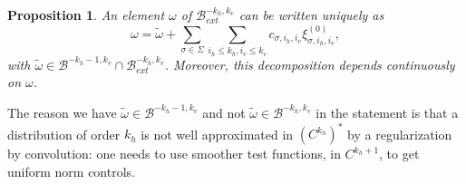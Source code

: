 \documentclass[11pt, a4paper, oneside, final, pagebackref]{amsart}
\newcommand{\boB}{\mathcal{B}}
\renewcommand{\leq}{\leqslant}
\newtheorem{prop}[thm]{Proposition}
\theoremstyle{definition}
\numberwithin{equation}{section}
\begin{document}
\begin{prop}
\label{prop:finite_codim} An element $\omega$ of $\boB_{ext}^{-k_h, k_v}$ can
be written uniquely as
\begin{equation}
\label{eq:dec_omega}
\omega = \tilde \omega + \sum_{\sigma \in \Sigma} \sum_{i_h \leq k_h, i_v\leq
k_v} c_{\sigma, i_h, i_v} \xi^{(0)}_{\sigma, i_h, i_v},
\end{equation}
with $\tilde\omega \in\boB^{-k_h-1, k_v} \cap \boB_{ext}^{-k_h, k_v}$.
Moreover, this decomposition depends continuously on $\omega$.
\end{prop}
The reason we have $\tilde\omega \in\boB^{-k_h-1, k_v}$ and not $\tilde\omega
\in\boB^{-k_h, k_v}$ in the statement is that a distribution of order $k_h$
is not well approximated in $(C^{k_h})^*$ by a regularization by convolution:
one needs to use smoother test functions, in $C^{k_h+1}$, to get uniform norm
controls.
\end{document}
